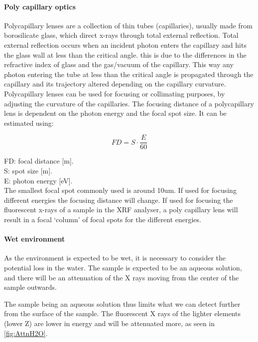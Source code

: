 \paragraph{Poly capillary optics}
Polycapillary lenses are a collection of thin tubes (capillaries), usually made from borosilicate glass, which direct x-rays through total external reflection. Total external reflection occurs when an incident photon enters the capillary and hits the glass wall at less than the critical angle. this is due to the differences in the refractive index of glass and the gas/vacuum of the capillary. This way any photon entering the tube at less than the critical angle is propagated through the capillary and its trajectory altered depending on the capillary curvature. Polycapillary lenses can be used for focusing or collimating purposes, by adjusting the curvature of the capillaries.
The focusing distance of a polycapillary lens is dependent on the photon energy and the focal spot size. It can be estimated using\citep{Shaik_1995}:

\begin{equation}
FD = S \cdot \frac{E}{60}
\end{equation}

\noindent FD: focal distance [m].\\
S: spot size [m].\\
E: photon energy [eV].\\

The smallest focal spot commonly used is around 10um.
If used for focusing different energies the focusing distance will change. If used for focusing the fluorescent x-rays of a sample in the XRF analyser, a poly capillary lens will result in a focal ‘column’ of focal spots for the different energies. 


\paragraph{Wet environment}
As the environment is expected to be wet, it is necessary to consider the potential loss in the water. The sample is expected to be an aqueous solution, and there will be an attenuation of the X rays moving from the center of the sample outwards. 

The sample being an aqueous solution thus limits what we can detect further from the surface of the sample. The fluorescent X rays of the lighter elements (lower Z)  are lower in energy and will be attenuated more, as seen in \ref{fig:AttnH2O}.

